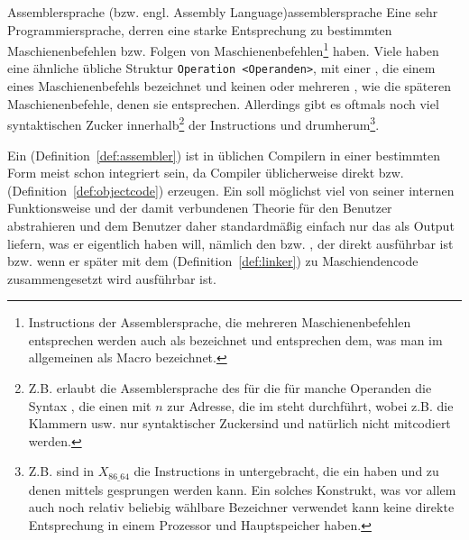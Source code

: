 \begin{Definition}{Assemblersprache (bzw. engl. Assembly Language)}{assemblersprache}
  Eine sehr  Programmiersprache, derren  eine starke Entsprechung zu bestimmten Maschienenbefehlen bzw. Folgen von Maschienenbefehlen\footnote{Instructions der Assemblersprache, die mehreren Maschienenbefehlen entsprechen werden auch als  bezeichnet und entsprechen dem, was man im allgemeinen als Macro bezeichnet.} haben.
  Viele  haben eine ähnliche übliche Struktur \verb|Operation <Operanden>|, mit einer , die einem  eines Maschienenbefehls bezeichnet und keinen oder mehreren , wie die späteren Maschienenbefehle, denen sie entsprechen. Allerdings gibt es oftmals noch viel \glqq syntaktischen Zucker\grqq\; innerhalb\footnote{Z.B. erlaubt die Assemblersprache des  für die  für manche Operanden die Syntax , die einen  mit  $n$ zur Adresse, die im   steht durchführt, wobei z.B. die Klammern \smalltt{()} usw. nur \glqq syntaktischer Zucker\grqq sind und natürlich nicht mitcodiert werden.} der Instructions und drumherum\footnote{Z.B. sind in $X_{86\_64}$ die Instructions in  untergebracht, die ein  haben und zu denen mittels   gesprungen werden kann. Ein solches Konstrukt, was vor allem auch noch relativ beliebig wählbare Bezeichner verwendet kann keine direkte Entsprechung in einem Prozessor und Hauptspeicher haben.}.
\end{Definition}

Ein  (Definition~\ref{def:assembler}) ist in üblichen Compilern in einer bestimmten Form meist schon integriert sein, da Compiler üblicherweise direkt  bzw.  (Definition~\ref{def:objectcode}) erzeugen. Ein  soll möglichst viel von seiner internen Funktionsweise und der damit verbundenen Theorie für den Benutzer abstrahieren und dem Benutzer daher standardmäßig einfach nur das als Output liefern, was er eigentlich haben will, nämlich den  bzw. , der direkt ausführbar ist bzw. wenn er später mit dem  (Definition~\ref{def:linker}) zu Maschiendencode zusammengesetzt wird ausführbar ist.

